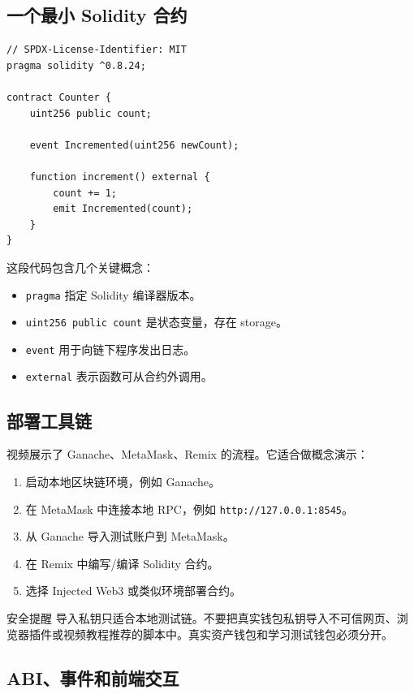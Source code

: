\documentclass[UTF8,11pt]{ctexart}
\begin{document}
\subsection{一个最小 Solidity 合约}

\begin{verbatim}
// SPDX-License-Identifier: MIT
pragma solidity ^0.8.24;

contract Counter {
    uint256 public count;

    event Incremented(uint256 newCount);

    function increment() external {
        count += 1;
        emit Incremented(count);
    }
}
\end{verbatim}

这段代码包含几个关键概念：
\begin{itemize}
  \item \texttt{pragma} 指定 Solidity 编译器版本。
  \item \texttt{uint256 public count} 是状态变量，存在 storage。
  \item \texttt{event} 用于向链下程序发出日志。
  \item \texttt{external} 表示函数可从合约外调用。
\end{itemize}

\subsection{部署工具链}

视频展示了 Ganache、MetaMask、Remix 的流程。它适合做概念演示：
\begin{enumerate}
  \item 启动本地区块链环境，例如 Ganache。
  \item 在 MetaMask 中连接本地 RPC，例如 \texttt{http://127.0.0.1:8545}。
  \item 从 Ganache 导入测试账户到 MetaMask。
  \item 在 Remix 中编写/编译 Solidity 合约。
  \item 选择 Injected Web3 或类似环境部署合约。
\end{enumerate}

\begin{warnbox}{安全提醒}
导入私钥只适合本地测试链。不要把真实钱包私钥导入不可信网页、浏览器插件或视频教程推荐的脚本中。真实资产钱包和学习测试钱包必须分开。
\end{warnbox}

\subsection{ABI、事件和前端交互}
\end{document}
